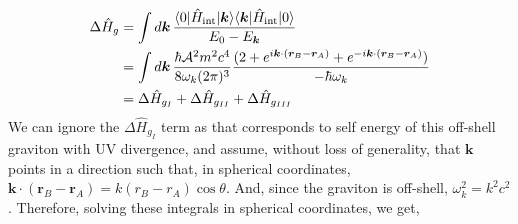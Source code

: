 \documentclass[12pt,a4paper]{report}
\theoremstyle{plain}
\theoremstyle{definition}
\theoremstyle{remark}
\newcommand{\Hint}{\hat{H}_{\text{int}}}
\DeclarePairedDelimiter\bra{\langle}{\rvert}
\DeclarePairedDelimiter\ket{\lvert}{\rangle}
\begin{document}
\begin{equation}
    \begin{aligned}
        \Delta \hat{H}_{g} &= \int d\bm{k}\,\frac{\bra{0}\Hint\ket{\bm{k}}\bra{\bm{k}}\Hint\ket{0}}{E_0 - E_{\bm{k}}}\\
        &= \int d\bm{k}\,\frac{\hbar \mathcal{A}^2 m^2 c^4}{8 \omega_k (2\pi)^3}\frac{(2 + e^{i\bm{k}\cdot(\bm{r}_B - \bm{r}_A)} + e^{-i\bm{k}\cdot(\bm{r}_B - \bm{r}_A)})}{-\hbar\omega_k}\\
        &= \Delta \hat{H}_{g_{I}} + \Delta \hat{H}_{g_{II}} + \Delta \hat{H}_{g_{III}}
    \end{aligned}
\end{equation}
We can ignore the \(\Delta \hat{H}_{g_I}\) term as that corresponds to self energy of this off-shell graviton with UV divergence, and assume, without loss of generality, that $\bm{k}$ points in a direction such that, in spherical coordinates, $\bm{k}\cdot(\bm{r}_B - \bm{r}_A) = k(r_B - r_A)\cos{\theta}$. And, since the graviton is off-shell, $\omega_k^2 = k^2c^2$. Therefore, solving these integrals in spherical coordinates, we get,
\end{document}
